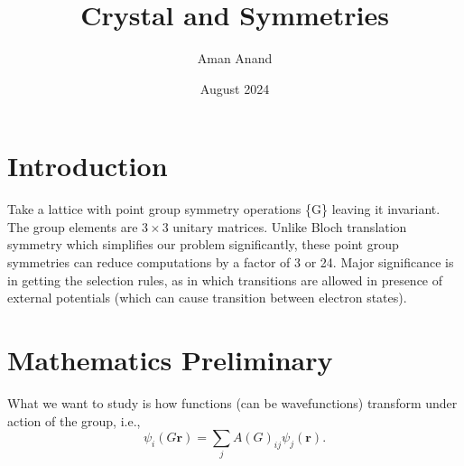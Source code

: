 \documentclass{article}
\title{Crystal and Symmetries}
\author{Aman Anand}
\date{August 2024}
\begin{document}
	
	\maketitle
	
	\section{Introduction}
	Take a lattice with point group symmetry operations \{G\} leaving it invariant. The group elements are $3 \times 3$ unitary matrices. Unlike Bloch translation symmetry which simplifies our problem significantly, these point group symmetries can reduce computations by a factor of 3 or 24. Major significance is in getting the selection rules, as in which transitions are allowed in presence of external potentials (which can cause transition between electron states). 
	
	\section{Mathematics Preliminary}
	What we want to study is how functions (can be wavefunctions) transform under action of the group, i.e.,
	\begin{equation}
		\psi_i (G\mathbf{r}) = \sum_j A(G)_{ij} \psi_j (\mathbf{r}) .
	\end{equation}
\end{document}

